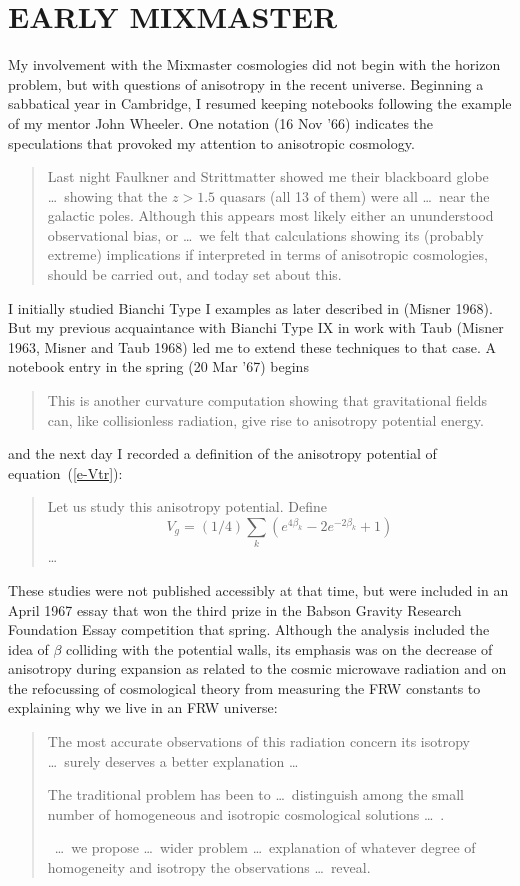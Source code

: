 \section{EARLY MIXMASTER}
\indent
My involvement with the Mixmaster cosmologies did not begin with the
horizon problem, but with questions of anisotropy in the recent
universe.  Beginning a sabbatical year in Cambridge, I resumed
keeping notebooks following the example of my mentor John Wheeler.
One notation (16 Nov '66) indicates the speculations that provoked my
attention to anisotropic cosmology.
\begin{quote}
Last night Faulkner and Strittmatter showed me their
blackboard globe \ldots\ showing that the $z>1.5$ quasars (all 13 of
them) were all \ldots\  near the galactic poles.  Although this
appears most likely either an ununderstood observational bias, or
\ldots\, we felt that calculations showing its (probably extreme)
implications if interpreted in terms of anisotropic cosmologies,
should be carried out, and today set about this.
\end{quote}
I initially studied Bianchi Type I examples as later described in
(Misner 1968). But my previous acquaintance with Bianchi Type IX in
work with Taub (Misner 1963, Misner and Taub 1968) led me to extend
these techniques to that case.  A notebook entry in the spring (20
Mar '67) begins
\begin{quote}
This is another curvature computation showing that gravitational
fields can, like collisionless radiation, give rise to anisotropy
potential energy.
\end{quote}
and the next day I recorded a definition of the anisotropy potential
of equation~(\ref{e-Vtr}):
\begin{quote}
Let us study this anisotropy potential. Define
$$
V_g = (1/4) \sum_k \left( e^{4\beta_k} - 2 e^{-2\beta_k} + 1
                   \right)
$$
\ldots
\end{quote}
These studies were not published accessibly at that time, but were
included in an April 1967 essay that won the third prize in the
Babson Gravity Research Foundation Essay competition that spring.
Although the analysis included the idea of $\beta$ colliding with the
potential walls, its emphasis was on the decrease of anisotropy
during expansion as related to the cosmic microwave radiation and on
the refocussing of cosmological theory from measuring the FRW
constants to explaining why we live in an FRW universe:
\begin{quote}
The most accurate observations of this radiation concern
its isotropy \ldots\ surely
deserves a better explanation \ldots\

The traditional problem has been to \ldots\ distinguish among the
small number of homogeneous and isotropic cosmological solutions
\ldots\ .

\ \ldots\ we propose \ldots\ wider problem \ldots\ explanation of
whatever degree of homogeneity and isotropy the observations \ldots\
reveal.
\end{quote}
